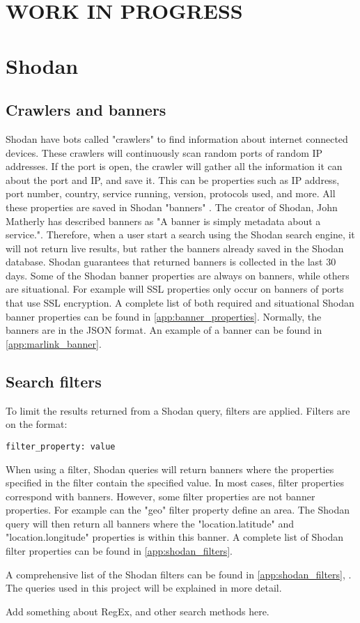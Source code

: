 \section{WORK IN PROGRESS} \label{sec:new}

\section{Shodan}
\subsection{Crawlers and banners}
Shodan have bots called "crawlers" to find information about internet connected devices. These crawlers will continuously scan random ports of random IP addresses. If the port is open, the crawler will gather all the information it can about the port and IP, and save it. This can be properties such as IP address, port number, country, service running, version, protocols used, and more. 
All these properties are saved in Shodan "banners" . The creator of Shodan, John Matherly has described banners as "A banner is simply metadata about a service.". \cite{banner} 
Therefore, when a user start a search using the Shodan search engine, it will not return live results, but rather the banners already saved in the Shodan database. Shodan guarantees that returned banners is collected in the last 30 days. 
Some of the Shodan banner properties are always on banners, while others are situational. For example will SSL properties only occur on banners of ports that use SSL encryption. A complete list of both required and situational Shodan banner properties can be found in \cref{app:banner_properties}.
Normally, the banners are in the JSON format. An example of a banner can be found in \cref{app:marlink_banner}.


\subsection{Search filters} \label{sec:filters}
To limit the results returned from a Shodan query, filters are applied. Filters are on the format:
\begin{lstlisting}
filter_property: value
\end{lstlisting}
When using a filter, Shodan queries will return banners where the properties specified in the filter contain the specified value. In most cases, filter properties correspond with banners. However, some filter properties are not banner properties. For example can the "geo" filter property define an area. The Shodan query will then return all banners where the "location.latitude" and "location.longitude" properties is within this banner. A complete list of Shodan filter properties can be found in \cref{app:shodan_filters}.




A comprehensive list of the Shodan filters can be found in \cref{app:shodan_filters}, . The queries used in this project will be explained in more detail. 

Add something about RegEx, and other search methods here. 


